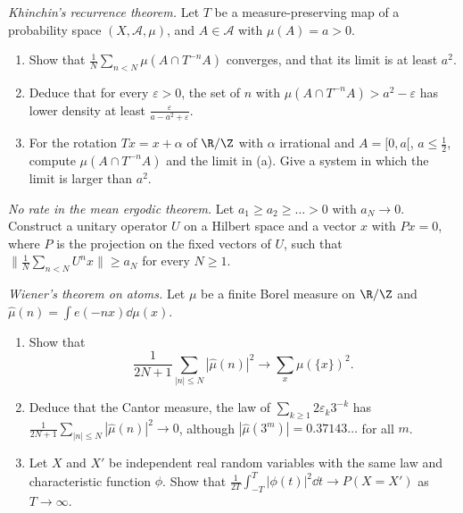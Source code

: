 \begin{exercise}[$\star\star$]\label{pb:khinchinrec}
\emph{Khinchin's recurrence theorem.} Let $T$ be a measure-preserving map of a probability space $(X,\mathcal A,\mu)$, and $A\in\mathcal A$ with $\mu(A)=a>0$.
\begin{enumerate}[label=(\alph*)]
\item Show that $\frac1N\sum_{n<N}\mu(A\cap T^{-n}A)$ converges, and that its limit is at least $a^2$.
\item Deduce that for every $\varepsilon>0$, the set of $n$ with $\mu(A\cap T^{-n}A)>a^2-\varepsilon$ has lower density at least $\frac\varepsilon{a-a^2+\varepsilon}$.
\item For the rotation $Tx=x+\alpha$ of $\R/\Z$ with $\alpha$ irrational and $A=[0,a[$, $a\le\frac12$, compute $\mu(A\cap T^{-n}A)$ and the limit in (a). Give a
system in which the limit is larger than $a^2$.
\end{enumerate}
\end{exercise}

\begin{exercise}[$\star\star$]\label{pb:norate}
\emph{No rate in the mean ergodic theorem.} Let $a_1\ge a_2\ge\dots>0$ with $a_N\to0$. Construct a unitary operator $U$ on a Hilbert space and a vector $x$
with $Px=0$, where $P$ is the projection on the fixed vectors of $U$, such that $\bigl\|\frac1N\sum_{n<N}U^nx\bigr\|\ge a_N$ for every $N\ge1$.
\end{exercise}

\begin{exercise}[$\star\star$]\label{pb:wiener}
\emph{Wiener's theorem on atoms.} Let $\mu$ be a finite Borel measure on $\R/\Z$ and $\hat\mu(n)=\int e(-nx)\dd\mu(x)$.
\begin{enumerate}[label=(\alph*)]
\item Show that
\[
\frac1{2N+1}\sum_{|n|\le N}|\hat\mu(n)|^2\longrightarrow\sum_x\mu(\{x\})^2.
\]
\item Deduce that the Cantor measure, the law of $\sum_{k\ge1}2\varepsilon_k3^{-k}$ has $\frac1{2N+1}\sum_{|n|\le N}|\hat\mu(n)|^2\to0$, although $|\hat\mu(3^m)|=0.37143\ldots$ for all $m$.
\item Let $X$ and $X'$ be independent real random variables with the same law and characteristic function $\phi$. Show that
$\frac1{2T}\int_{-T}^T|\phi(t)|^2\dd t\to P(X=X')$ as $T\to\infty$.
\end{enumerate}
\end{exercise}

